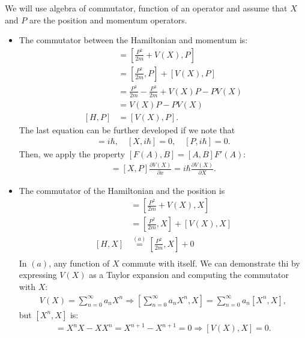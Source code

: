 \documentclass[letterpaper,11pt,twoside]{article}
\begin{document}
\begin{enumerate}[itemsep=0pt,topsep=0pt,label=\alph*.]
\begin{enumerate}[itemsep=0pt,topsep=0pt]
    We will use algebra of commutator, function of an operator and assume that $X$ and $P$ are the position and momentum operators.
    \begin{itemize}[itemsep=0pt,topsep=0pt]
      \item The commutator between the Hamiltonian and momentum is:
      \begin{align*}
        [H,P]&=\left[\frac{P^2}{2m}+V(X),P\right]\\
        &=\left[\frac{P^2}{2m},P\right]+[V(X),P]\\
        &=\frac{P^3}{2m}-\frac{P^3}{2m}+V(X)P-PV(X)\\
        &=V(X)P-PV(X)\\
        [H,P]&=[V(X),P].
      \end{align*}
      The last equation can be further developed if we note that
      \begin{align*}
        [X,P]=i\hbar,\quad[X,i\hbar]=0,\quad[P,i\hbar]=0.
      \end{align*}
      Then, we apply the property $[F(A),B]=[A,B]F'(A)$:
      \begin{align}
        [H,P]=[X,P]\frac{\partial V(X)}{\partial x}=i\hbar\frac{\partial V(X)}{\partial X}.
        \label{eq:commutatorHP}
      \end{align}
      \item The commutator of the Hamiltonian and the position is
      \begin{align*}
        [H,X]&=\left[\frac{P^2}{2m}+V(X),X\right]\\
        &=\left[\frac{P^2}{2m},X\right]+[V(X),X]\\
        [H,X]&\stackrel{(a)}{=}\left[\frac{P^2}{2m},X\right]+0\\
      \end{align*}
      In $(a)$, any function of $X$ commute with itself. We can demonstrate thi by expressing $V(X)$ as a Taylor expansion and computing the commutator with $X$:
      \begin{align*}
        V(X)=\sum_{n=0}^\infty a_nX^n\Longrightarrow\left[\sum_{n=0}^\infty a_nX^n,X\right]=\sum_{n=0}^\infty a_n[X^n,X],
      \end{align*}
      but $[X^n,X]$ is:
      \begin{align*}
        [X^n,X]=X^nX-XX^n=X^{n+1}-X^{n+1}=0\Longrightarrow[V(X),X]=0.
      \end{align*}


\end{itemize}
\end{enumerate}
\end{enumerate}
\end{document}
